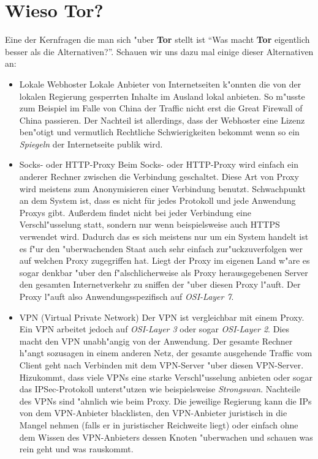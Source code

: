 \documentclass[titlepage]{article}
\begin{document}
\newpage
\section{Wieso Tor?}
Eine der Kernfragen die man sich "uber \textbf{Tor} stellt ist ``Was macht \textbf{Tor} eigentlich besser als die Alternativen?''. Schauen wir uns dazu mal einige dieser Alternativen an:

\begin{itemize}
\item Lokale Webhoster
\newline
Lokale Anbieter von Internetseiten k"onnten die von der lokalen Regierung gesperrten Inhalte im Ausland lokal anbieten. So m"usste zum Beispiel im Falle von China der Traffic nicht erst die Great Firewall of China passieren. Der Nachteil ist allerdings, dass der Webhoster eine Lizenz ben"otigt und vermutlich Rechtliche Schwierigkeiten bekommt wenn so ein \textit{Spiegeln} der Internetseite publik wird.
\item Socks- oder HTTP-Proxy
\newline
Beim Socks- oder HTTP-Proxy wird einfach ein anderer Rechner zwischen die Verbindung geschaltet. Diese Art von Proxy wird meistens zum Anonymisieren einer Verbindung benutzt.
Schwachpunkt an dem System ist, dass es nicht für jedes Protokoll und jede Anwendung Proxys gibt. Außerdem findet nicht bei jeder Verbindung eine Verschl"usselung statt, sondern nur wenn beispielsweise auch HTTPS verwendet wird. Dadurch das es sich meistens nur um ein System handelt ist es f"ur den "uberwachenden Staat auch sehr einfach zur"uckzuverfolgen wer auf welchen Proxy zugegriffen hat. Liegt der Proxy im eigenen Land w"are es sogar denkbar "uber den f"alschlicherweise als Proxy herausgegebenen Server den gesamten Internetverkehr zu sniffen der "uber diesen Proxy l"auft. Der Proxy l"auft also  Anwendungsspezifisch auf \textit{OSI-Layer 7}.
\item VPN (Virtual Private Network)
\newline
Der VPN ist vergleichbar mit einem Proxy. Ein VPN arbeitet jedoch auf \textit{OSI-Layer 3} oder sogar \textit{OSI-Layer 2}. Dies macht den VPN unabh"angig von der Anwendung. Der gesamte Rechner h"angt sozusagen in einem anderen Netz, der gesamte ausgehende Traffic vom Client geht nach Verbinden mit dem VPN-Server "uber diesen VPN-Server. Hizukommt, dass viele VPNs eine starke Verschl"usselung anbieten oder sogar das IPSec-Protokoll unterst"utzen wie beispielsweise \textit{Strongswan}. Nachteile des VPNs sind "ahnlich wie beim Proxy. Die jeweilige Regierung kann die IPs von dem VPN-Anbieter blacklisten, den VPN-Anbieter juristisch in die Mangel nehmen (falls er in juristischer Reichweite liegt) oder einfach ohne dem Wissen des VPN-Anbieters dessen Knoten "uberwachen und schauen was rein geht und was rauskommt.
\end{itemize}
\end{document}
